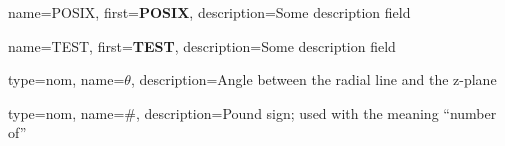 %
%
%


{
  name={POSIX},
  first={\textbf{POSIX}},
  description={Some description field}
}

{
  name={TEST},
  first={\textbf{TEST}},
  description={Some description field}
}


{
  type=nom,
  name=\ensuremath{\theta},
  description=Angle between the radial line and the z-plane
}

{
  type=nom,
  name=\ensuremath{\#},
  description=Pound sign; used with the meaning ``number of''
}
